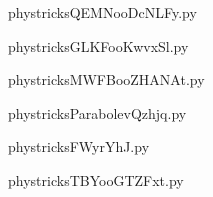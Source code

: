     \newcommand{\CaptionFigQEMNooDcNLFy}{<+Type your caption here+>}
    \begin{center}
        
    \end{center}
    phystricksQEMNooDcNLFy.py

    

    \clearpage
    


    \newcommand{\CaptionFigGLKFooKwvxSl}{<+Type your caption here+>}
    \begin{center}
        
    \end{center}
    phystricksGLKFooKwvxSl.py

    

    \clearpage
    


    \newcommand{\CaptionFigMWFBooZHANAt}{<+Type your caption here+>}
    \begin{center}
        
    \end{center}
    phystricksMWFBooZHANAt.py

    

    \clearpage
    


    \newcommand{\CaptionFigParabolevQzhjq}{<+Type your caption here+>}
    \begin{center}
        
    \end{center}
    phystricksParabolevQzhjq.py

    

    \clearpage
    


    \newcommand{\CaptionFigFWyrYhJ}{<+Type your caption here+>}
    \begin{center}
        
    \end{center}
    phystricksFWyrYhJ.py

    

    \clearpage
    


    \newcommand{\CaptionFigTBYooGTZFxt}{<+Type your caption here+>}
    \begin{center}
        
    \end{center}
    phystricksTBYooGTZFxt.py

